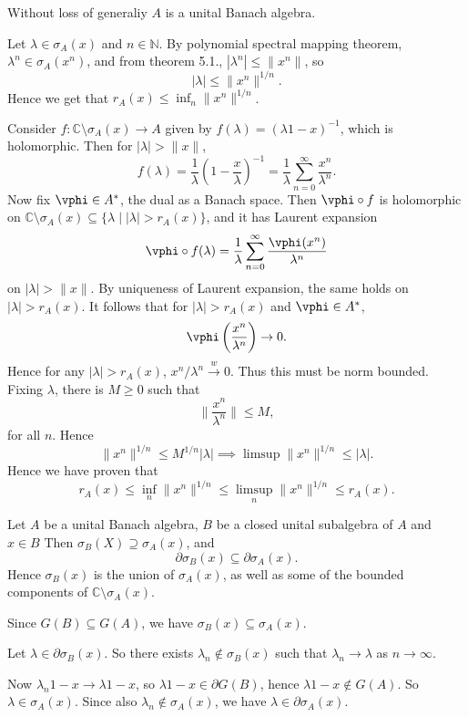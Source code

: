 \documentclass[12pt]{article}
\begin{document}
\begin{proofbox}
	Without loss of generaliy $A$ is a unital Banach algebra.

	Let $\lambda \in \sigma_A(x)$ and $n \in \mathbb{N}$. By polynomial spectral mapping theorem, $\lambda^{n} \in \sigma_A(x^{n})$, and from theorem 5.1., $|\lambda^{n}| \leq \|x^{n}\|$, so
	\[
	|\lambda| \leq \|x^{n}\|^{1/n}.
	\]
	Hence we get that $r_A(x) \leq \inf_n \|x^n\|^{1/n}$.

	Consider $f : \mathbb{C}\setminus \sigma_A(x) \to A$ given by $f(\lambda) = (\lambda 1 - x)^{-1}$, which is holomorphic. Then for $|\lambda| > \|x\|$,
	\[
	f(\lambda) = \frac 1\lambda \left(1 - \frac x \lambda \right)^{-1} = \frac 1 \lambda \sum_{n = 0}^{\infty} \frac{x^n}{\lambda^n}.
	\]
	Now fix $\vphi \in A^{\ast}$, the dual as a Banach space. Then $\vphi \circ f$ is holomorphic on $\mathbb{C} \setminus \sigma_A(x) \subseteq \{\lambda \mid |\lambda| > r_A(x)\}$, and it has Laurent expansion
	\[
	\vphi \circ f(\lambda) = \frac 1 \lambda \sum_{n = 0}^\infty \frac{\vphi(x^n)}{\lambda^{n}}
	\]
	on $|\lambda| > \|x\|$. By uniqueness of Laurent expansion, the same holds on $|\lambda| > r_A(x)$. It follows that for $|\lambda| > r_A(x)$ and $\vphi \in A^{\ast}$,
	\[
	\vphi \left( \frac{x^n}{ \lambda^n} \right) \to 0.
	\]
	Hence for any $|\lambda| > r_A(x)$, $x^n/\lambda^{n} \overset w\to 0$. Thus this must be norm bounded. Fixing $\lambda$, there is $M \geq 0$ such that
	\[
	\biggl\|\frac{x^n}{\lambda^n}\biggr\| \leq M,
	\]
	for all $n$. Hence
	\[
	\|x^{n}\|^{1/n} \leq M^{1/n} |\lambda| \implies \limsup \|x^{n}\|^{1/n} \leq |\lambda|.
	\]
	Hence we have proven that
	\[
	r_A(x) \leq \inf_n \|x^{n}\|^{1/n} \leq \limsup_n \|x^{n}\|^{1/n} \leq r_A(x).
	\]
\end{proofbox}

\begin{theorem}
	Let $A$ be a unital Banach algebra, $B$ be a closed unital subalgebra of $A$ and $x \in B$ Then $\sigma_B(X) \supseteq \sigma_A(x)$, and
	\[
	\partial \sigma_B(x) \subseteq \partial \sigma_A(x).
	\]
	Hence $\sigma_B(x)$ is the union of $\sigma_A(x)$, as well as some of the bounded components of $\mathbb{C} \setminus \sigma_A(x)$.
\end{theorem}

\begin{proofbox}
	Since $G(B) \subseteq G(A)$, we have $\sigma_B(x) \subseteq \sigma_A(x)$.

	Let $\lambda \in \partial \sigma_B(x)$. So there exists $\lambda_n \not \in \sigma_B(x)$ such that $\lambda_n \to \lambda$ as $n \to \infty$.

	Now $\lambda_n 1 - x \to \lambda 1 - x$, so $\lambda 1 - x \in \partial G(B)$, hence $\lambda 1 - x \not \in G(A)$. So $\lambda \in \sigma_A(x)$. Since also $\lambda_n \not \in \sigma_A(x)$, we have $\lambda \in \partial \sigma_A(x)$.
\end{proofbox}
\end{document}
